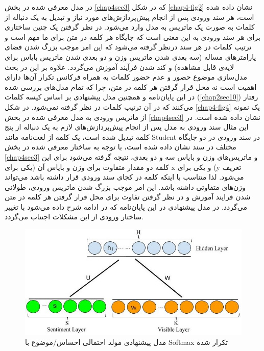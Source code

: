 در مدل معرفی‌ شده در بخش
\ref{chap4sec3}
که در شکل
\ref{chap4-fig2}
نشان داده شده است، هر سند ورودی پس از انجام پیش‌پردازش‌های مورد نیاز و تبدیل به یک دنباله از کلمات به صورت یک ماتریس به مدل وارد می‌‌شود. در نظر گرفتن یک چنین ساختاری برای هر سند ورودی به این معنی‌ است که جایگاه هر کلمه در متن برای ما مهم است و ترتیب کلمات در هر سند درنظر گرفته می‌‌شود که این امر موجب بزرگ شدن فضای پارامتر‌های مساله (سه‌ بعدی شدن ماتریس وزن و دو بعدی شدن ماتریس بایاس برای لایه‌ی قابل مشاهده) و کند شدن فرآیند آموزش می‌‌گردد. علاوه بر این در بحث مدل‌سازی موضوع حضور و عدم حضور کلمات به همراه فرکانس تکرار آن‌ها دارای اهمیت است نه محل قرار گرفتن هر کلمه در متن، چرا که تمام مدل‌های بررسی‌ شده در این پایان‌‌نامه و همچنین مدل پیشنهادی بر اساس کیسه کلمات
(\ref{chap2sec10})
رفتار می‌‌کنند که در آن ترتیب کلمات در نظر گرفته نمی‌‌شود.  در شکل
\ref{chap4-fig4}
یک نمونه از ماتریس ورودی به مدل معرفی‌ شده در بخش
\ref{chap4sec3}
نشان داده شده است. در این مثال سند ورودی به مدل پس از انجام پیش‌پردازش‌های لازم به یک دنباله از پنج کلمه تبدیل شده است، یک کلمه از لغت‌نامه  مانند 
Student
در سند ورودی در دو جایگاه مختلف در سند نشان داده شده است، با توجه به ساختار معرفی‌ شده در بخش
\ref{chap4sec3}
و ماتریس‌های وزن و بایاس سه‌ و دو بعدی، نتیجه گرفته می‌‌شود برای این کلمه دو مقدار متفاوت برای وزن و بایاس آن (یکی برای x
 و یکی برای 
 (y
 تعریف می‌‌شود. لذا متناسب با اینکه کلمه در کجای سند ورودی قرار داشته باشد می‌تواند وزن‌های متفاوتی داشته باشد. این امر موجب بزرگ شدن ماتریس ورودی،  طولانی‌ شدن فرایند آموزش و در نظر گرفتن تفاوت برای محل قرار گرفتن هر کلمه در متن می‌گردد. در مدل پیشنهادی در این پایان‌‌نامه که در ادامه شرح داده می‌‌شود با تغییر ساختار ورودی از این مشکلات اجتناب می‌‌گردد.

\begin{figure}[!t]
	\centering
	\includegraphics[scale=0.5]{chap4-img/SRS}
	\caption{مدل پیشنهادی مولد احتمالی احساس/موضوع با Softmax تکرار شده}
	\label{chap4-fig3}
\end{figure}

